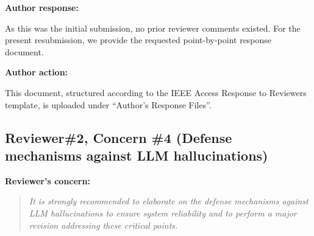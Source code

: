 \documentclass[11pt]{article}
\newif\ifshowstatus
\newcommand{\statusline}[2]{\ifshowstatus\par\noindent\textcolor{status#1}{\textbf{Status: \MakeUppercase{#1}.} #2}\par\smallskip\fi}
\newenvironment{concern}[3][pending]{\subsection*{\ifshowstatus\textcolor{status#1}{#2}\else#2\fi}\statusline{#1}{#3}\textbf{Reviewer's concern:}\begin{quote}\itshape}{\end{quote}}
\newenvironment{response}{\textbf{Author response:}\par\smallskip}{\par\medskip}
\newenvironment{action}{\textbf{Author action:}\par\smallskip}{\par\bigskip\noindent\hrulefill\par\bigskip}
\begin{document}
\begin{response}
As this was the initial submission, no prior reviewer comments existed.
For the present resubmission, we provide the requested point-by-point response document.
\end{response}

\begin{action}
This document, structured according to the IEEE Access Response to Reviewers template, is uploaded under ``Author's Response Files''.
\end{action}

\begin{concern}[pending]{Reviewer\#2, Concern \#4 (Defense mechanisms against LLM hallucinations)}{Section III-B4 can be written now from existing mechanisms; B8 (adversarial test) is optional---if skipped, delete the red span and this block is complete.}
It is strongly recommended to elaborate on the defense mechanisms against LLM hallucinations to ensure system reliability and to perform a major revision addressing these critical points.
\end{concern}
\end{document}
